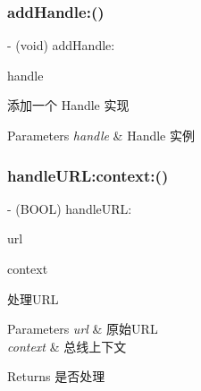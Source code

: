 \subsubsection{\texorpdfstring{add\+Handle\+:()}{addHandle:()}}
{\footnotesize\ttfamily -\/ (void) add\+Handle\+: \begin{DoxyParamCaption}\item[{(id$<$ Alibc\+U\+R\+L\+Bus\+Handle $>$)}]{handle }\end{DoxyParamCaption}}

添加一个 Handle 实现


\begin{DoxyParams}{Parameters}
{\em handle} & Handle 实例 \\
\hline
\end{DoxyParams}
\mbox{\label{interface_alibc_u_r_l_bus_a899cf42bb842558727058ff261e68cfd}} 
\subsubsection{\texorpdfstring{handle\+U\+R\+L\+:context\+:()}{handleURL:context:()}}
{\footnotesize\ttfamily -\/ (B\+O\+OL) handle\+U\+R\+L\+: \begin{DoxyParamCaption}\item[{(N\+S\+U\+RL $\ast$)}]{url }\item[{context:(\mbox{\hyperlink{interface_alibc_u_r_l_bus_context}{Alibc\+U\+R\+L\+Bus\+Context}} $\ast$)}]{context }\end{DoxyParamCaption}}

处理\+U\+RL 
\begin{DoxyParams}{Parameters}
{\em url} & 原始\+U\+RL \\
\hline
{\em context} & 总线上下文 \\
\hline
\end{DoxyParams}
\begin{DoxyReturn}{Returns}
是否处理 
\end{DoxyReturn}
\mbox{\label{interface_alibc_u_r_l_bus_aec652f94f7ac2556efd091669ae76298}} 
